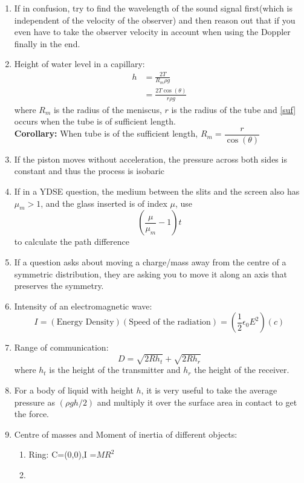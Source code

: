 \documentclass{article}
\numberwithin{equation}{section}
\numberwithin{figure}{section}
\begin{document}
\begin{enumerate}
	\item If in confusion, try to find the wavelength of the sound signal first(which is independent of the velocity of the observer) and then reason out that if you even have to take the observer velocity in account when using the Doppler finally in the end.
	\item Height of water level in a capillary:
		\begin{align}
			h&=\frac{2T}{R_m \rho g}\\
			&=\frac{2T\cos(\theta)}{r \rho g}\label{suf}
		\end{align}
		where $R_m$ is the radius of the meniscus, $r$ is the radius of the tube  and \ref{suf} occurs when the tube is of sufficient length.\\
		\textbf{Corollary:} When tube is of the sufficient length, $R_m=\dfrac{r}{\cos(\theta)}$ 
	\item If the piston moves without acceleration, the pressure across both sides is constant and thus the process is isobaric
	\item If in a YDSE question, the medium between the slits and the screen also has $\mu_{m}>1$, and the glass inserted is of index $\mu$, use $$\left(\dfrac{\mu}{\mu_m}-1\right)t$$ to calculate the path difference
	\item If a question asks about moving a charge/mass away from the centre of a symmetric distribution, they are asking you to move it along an axis that preserves the symmetry.
	\item Intensity of an electromagnetic wave:
		\begin{equation}
			I=(\text{Energy Density})(\text{Speed of the radiation})=\left(\frac{1}{2}\epsilon_0 E^2\right)(c)
		\end{equation}
	\item Range of communication:
		\begin{equation}
			D=\sqrt{2R h_{t}}+\sqrt{2R h_{r}}
		\end{equation}
		where $h_t$ is the height of the transmitter and $h_r$ the height of the receiver.
	\item For a body of liquid with height $h$, it is very useful to take the average pressure as $(\rho gh/2)$ and multiply it over the surface area in contact to get the force.
	\item Centre of masses and Moment of inertia of different objects:
		\begin{enumerate}
			\item Ring: C=(0,0),I =$MR^2$
			\item

\end{enumerate}
\end{enumerate}
\end{document}
